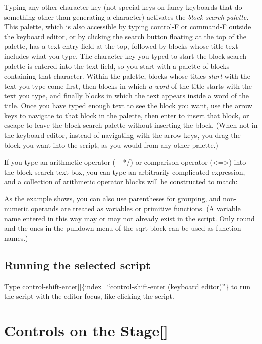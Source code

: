 \documentclass[
  letterpaper,
]{book}
\begin{document}
Typing any other character key (not special keys on fancy keyboards that
do something other than generating a character) activates the
\emph{block search palette.} This palette, which is also accessible by
typing control-F or command-F outside the keyboard editor, or by
clicking the search button floating at the top of the palette, has a
text entry field at the top, followed by blocks whose title text
includes what you type. The character key you typed to start the block
search palette is entered into the text field, so you start with a
palette of blocks containing that character. Within the palette, blocks
whose titles \emph{start} with the text you type come first, then blocks
in which \emph{a word} of the title starts with the text you type, and
finally blocks in which the text appears inside a word of the title.
Once you have typed enough text to see the block you want, use the arrow
keys to navigate to that block in the palette, then enter to insert that
block, or escape to leave the block search palette without inserting the
block. (When not in the keyboard editor, instead of navigating with the
arrow keys, you drag the block you want into the script, as you would
from any other palette.)

If you type an arithmetic operator (+-*/) or comparison operator
(\textless=\textgreater) into the block search text box, you can type an
arbitrarily complicated expression, and a collection of arithmetic
operator blocks will be constructed to match:

As the example shows, you can also use parentheses for grouping, and
non-numeric operands are treated as variables or primitive functions. (A
variable name entered in this way may or may not already exist in the
script. Only round and the ones in the pulldown menu of the sqrt block
can be used as function names.)

\subsection{Running the selected
script}\label{running-the-selected-script}

Type control-shift-enter{[}{]}\{index=``control-shift-enter (keyboard
editor)''\} to run the script with the editor focus, like clicking the
script.

\section{Controls on the Stage{[}{]}}\label{controls-on-the-stage}
\end{document}
